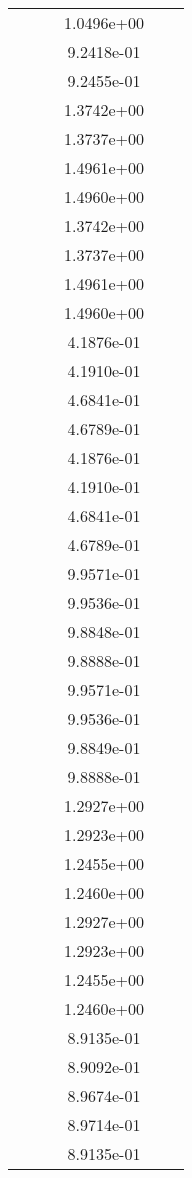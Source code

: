 \begin{xltabular}{\textwidth}{r|rS[table-format=1.3e+2]S[table-format=1.4e+2]S[table-format=1.4e+2]S[table-format=-1.5]}
&  &  & 1.0496e+00 & & \\
&  &  & 9.2418e-01 & & \\
&  &  & 9.2455e-01 & & \\
&  &  & 1.3742e+00 & & \\
&  &  & 1.3737e+00 & & \\
&  &  & 1.4961e+00 & & \\
&  &  & 1.4960e+00 & & \\
&  &  & 1.3742e+00 & & \\
&  &  & 1.3737e+00 & & \\
&  &  & 1.4961e+00 & & \\
&  &  & 1.4960e+00 & & \\
&  &  & 4.1876e-01 & & \\
&  &  & 4.1910e-01 & & \\
&  &  & 4.6841e-01 & & \\
&  &  & 4.6789e-01 & & \\
&  &  & 4.1876e-01 & & \\
&  &  & 4.1910e-01 & & \\
&  &  & 4.6841e-01 & & \\
&  &  & 4.6789e-01 & & \\
&  &  & 9.9571e-01 & & \\
&  &  & 9.9536e-01 & & \\
&  &  & 9.8848e-01 & & \\
&  &  & 9.8888e-01 & & \\
&  &  & 9.9571e-01 & & \\
&  &  & 9.9536e-01 & & \\
&  &  & 9.8849e-01 & & \\
&  &  & 9.8888e-01 & & \\
&  &  & 1.2927e+00 & & \\
&  &  & 1.2923e+00 & & \\
&  &  & 1.2455e+00 & & \\
&  &  & 1.2460e+00 & & \\
&  &  & 1.2927e+00 & & \\
&  &  & 1.2923e+00 & & \\
&  &  & 1.2455e+00 & & \\
&  &  & 1.2460e+00 & & \\
&  &  & 8.9135e-01 & & \\
&  &  & 8.9092e-01 & & \\
&  &  & 8.9674e-01 & & \\
&  &  & 8.9714e-01 & & \\
&  &  & 8.9135e-01 & & \\

\end{xltabular}
